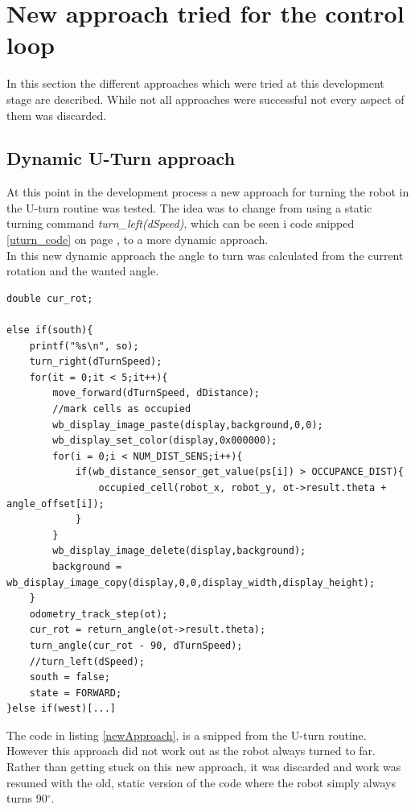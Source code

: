 \section{New approach tried for the control loop}
In this section the different approaches which were tried at this development stage are described. While not all approaches were successful not every aspect of them was discarded.

\subsection{Dynamic U-Turn approach}
At this point in the development process a new approach for turning the robot in the U-turn routine was tested. The idea was to change from using a static turning command \textit{turn\_left(dSpeed)}, which can be seen i code snipped \ref{uturn_code} on page \pageref{uturn_code}, to a more dynamic approach. \\
In this new dynamic approach the angle to turn was calculated from the current rotation and the wanted angle.

\begin{lstlisting}[caption={Code snipped of the new approach}, label={newApproach}]
double cur_rot;
	
else if(south){
	printf("%s\n", so);
	turn_right(dTurnSpeed);
	for(it = 0;it < 5;it++){
		move_forward(dTurnSpeed, dDistance);
		//mark cells as occupied
		wb_display_image_paste(display,background,0,0);
		wb_display_set_color(display,0x000000);
		for(i = 0;i < NUM_DIST_SENS;i++){
			if(wb_distance_sensor_get_value(ps[i]) > OCCUPANCE_DIST){
				occupied_cell(robot_x, robot_y, ot->result.theta + angle_offset[i]);
			}
		}
		wb_display_image_delete(display,background);
		background = wb_display_image_copy(display,0,0,display_width,display_height);
	}
	odometry_track_step(ot);
	cur_rot = return_angle(ot->result.theta);
	turn_angle(cur_rot - 90, dTurnSpeed);
	//turn_left(dSpeed);
	south = false;
	state = FORWARD;
}else if(west)[...]
\end{lstlisting}

The code in listing \ref{newApproach}, is a snipped from the U-turn routine. \\
However this approach did not work out as the robot always turned to far. Rather than getting stuck on this new approach, it was discarded and work was resumed with the old, static version of the code where the robot simply always turns 90$^{\circ}$. \\

